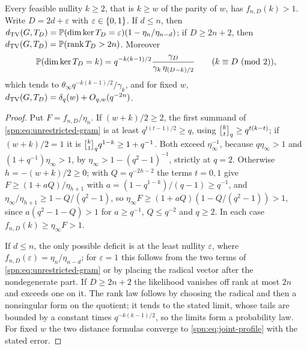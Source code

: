 \begin{lemma}\label{spn:lem:unrestricted-gram}
Every feasible nullity $k\ge2$, that is $k\ge w$ of the parity of $w$, has $f_{n,D}(k)>1$. Write
$D=2d+\varepsilon$ with $\varepsilon\in\{0,1\}$. If $d\le n$, then
$d_{\mathrm{TV}}(G,T_D)=\mathbb{P}(\dim\ker T_D=\varepsilon)(1-\eta_n/\eta_{n-d})$; if $D\ge2n+2$, then
$d_{\mathrm{TV}}(G,T_D)=\mathbb{P}(\operatorname{rank} T_D>2n)$. Moreover
\[
 \mathbb{P}(\dim\ker T_D=k)=q^{-k(k-1)/2}\frac{\gamma_D}{\gamma_k\,\eta_{(D-k)/2}}\qquad(k\equiv D\ (\mathrm{mod}\ 2)),
\]
which tends to $\theta_\infty q^{-k(k-1)/2}/\gamma_k$, and for fixed $w$,
$d_{\mathrm{TV}}(G,T_D)=\delta_q(w)+O_{q,w}(q^{-2n})$.
\end{lemma}

\begin{proof}
Put $F=f_{n,D}/\eta_n$. If $(w+k)/2\ge2$, the first summand of \eqref{spn:eq:unrestricted-gram} is at
least $q^{t(t-1)/2}\ge q$, using $\spnqbin ktq\ge q^{t(k-t)}$; if $(w+k)/2=1$ it is
$\spnqbin k1qq^{1-k}\ge1+q^{-1}$. Both exceed $\eta_\infty^{-1}$, because $q\eta_\infty>1$ and
$(1+q^{-1})\eta_\infty>1$, by $\eta_\infty>1-(q^2-1)^{-1}$, strictly at $q=2$. Otherwise
$h=-(w+k)/2\ge0$; with $Q=q^{-2h-2}$ the terms $t=0,1$ give $F\ge(1+aQ)/\eta_{h+1}$ with
$a=(1-q^{1-k})/(q-1)\ge q^{-1}$, and $\eta_\infty/\eta_{h+1}\ge1-Q/(q^2-1)$, so
$\eta_\infty F\ge(1+aQ)(1-Q/(q^2-1))>1$, since $a(q^2-1-Q)>1$ for $a\ge q^{-1}$, $Q\le q^{-2}$ and
$q\ge2$. In each case $f_{n,D}(k)\ge\eta_\infty F>1$.

If $d\le n$, the only possible deficit is at the least nullity $\varepsilon$, where
$f_{n,D}(\varepsilon)=\eta_n/\eta_{n-d}$; for $\varepsilon=1$ this follows from the two terms of
\eqref{spn:eq:unrestricted-gram} or by placing the radical vector after the nondegenerate part. If
$D\ge2n+2$ the likelihood vanishes off rank at most $2n$ and exceeds one on it. The rank law follows
by choosing the radical and then a nonsingular form on the quotient; it tends to the stated limit,
whose tails are bounded by a constant times $q^{-k(k-1)/2}$, so the limits form a probability law.
For fixed $w$ the two distance formulas converge to \eqref{spn:eq:joint-profile} with the stated
error.
\end{proof}

